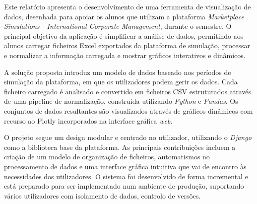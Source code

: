




Este  relatório apresenta o desenvolvimento de uma ferramenta de visualização de dados, desenhada para apoiar os alunos que utilizam a  plataforma \textit{Marketplace Simulations - International Corporate Management}, durante o semestre. O principal objetivo da aplicação é simplificar a análise de dados, permitindo aos alunos carregar ficheiros Excel exportados da plataforma de simulação, processar e normalizar a informação carregada e mostrar gráficos interativos e dinâmicos.

A solução proposta introduz um modelo de dados baseado nos períodos de simulação da plataforma, em que os utilizadores podem gerir os dados. Cada ficheiro carregado é analisado e convertido em ficheiros CSV estruturados através de uma pipeline de normalização, construída utilizando \textit{Python} e \textit{Pandas}. Os conjuntos de dados resultantes são visualizados através de gráficos dinâmicos com recurso ao Plotly incorporados na interface gráfica \textit{web}.

O projeto segue um design modular e centrado no utilizador, utilizando o \textit{Django} como a biblioteca base da plataforma. As principais contribuições incluem a criação de um modelo de organização de ficheiros, automatismos no processamento de dados e uma interface gráfica intuitiva que vai de encontro às necessidades dos utilizadores. O sistema foi desenvolvido de forma incremental e está preparado para ser implementado num ambiente de produção, suportando vários utilizadores com isolamento de dados, controlo de versões.




